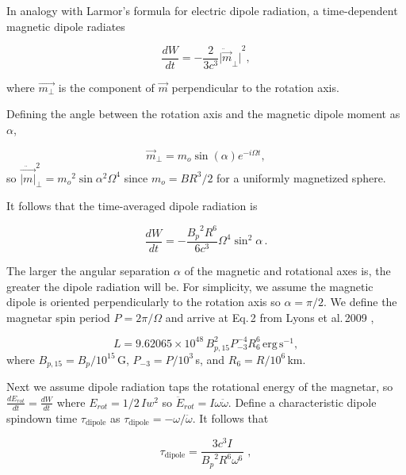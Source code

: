 \documentclass{article}
\begin{document}
In analogy with Larmor's formula for electric dipole radiation, a time-dependent magnetic dipole radiates

\begin{equation}
\frac{dW}{dt} = -\frac{2}{3c^3} {\ddot{|\vec{m}}_\perp|}^2,
\end{equation}

where $\vec{m_\perp}$ is the component of $\vec{m}$ perpendicular to the rotation axis.

Defining the angle between the rotation axis and the magnetic dipole moment as $\alpha$,

\begin{equation}\vec{m}_\perp = m_o  \sin({\alpha}) e^{-i\Omega t},\end{equation}
so $\ddot{\vec{|m|}}_\perp^2 = {m_o}^2 \sin{\alpha}^2 \Omega^4$
since $m_o = B R^3/2$ for a uniformly magnetized sphere.

It follows that the time-averaged dipole radiation is

\begin{equation} \label{eq:lumin}\frac{dW}{dt} = -\frac{{B_p}^2 R^6}{6c^3} \Omega^4 \sin^2{\alpha}\,.\end{equation}

The larger the angular separation $\alpha$ of the magnetic and rotational axes is, the greater the dipole radiation will be. For simplicity, we assume the magnetic dipole is oriented perpendicularly to the rotation axis so $\alpha=\pi/2$. We define the magnetar spin period $P= 2\pi/\Omega$ and arrive at Eq.\,2 from Lyons et al.\,2009 \cite{Lyons:2009ka},

\begin{equation} \label{eq:lum} L  = 9.62065 \times 10^{48}\, B^2_{p,15} P^{-4}_{-3} R^6_6\,\mathrm{erg \,s^{-1}},\end{equation}
where $B_{p,15} = B_p/10^{15}$\,G, $P_{-3}=P/10^3$\,s, and $R_6=R/10^6$\,km.

Next we assume dipole radiation taps the rotational energy of the magnetar, so $\frac{dE_{rot}}{dt} = \frac{dW}{dt}$ where $E_{rot} = 1/2\, I w^2$ so $\ddot{E}_{rot} = I \omega \ddot{\omega}$. Define a characteristic dipole spindown time $\tau_{\mathrm{dipole}}$ as $\tau_{\mathrm{dipole}} = - \omega/\ddot{\omega}$.
It follows that

\begin{equation}\label{eq:tdip}\tau_{\mathrm{dipole}} = \frac{3c^3 I}{{B_p}^2 R^6 \omega^6}\,\,,
\end{equation}
\end{document}
